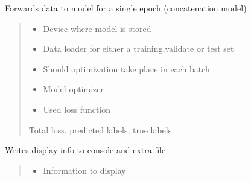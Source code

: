 \documentclass[letterpaper,10pt,english]{sphinxmanual}
\begin{document}
\begin{fulllineitems}
\begin{fulllineitems}
\label{\detokenize{net:net.UVANEMO.__multi_forward}}
\pysigstartsignatures
{}
\pysigstopsignatures
\sphinxAtStartPar
Forwards data to model for a single epoch (concatenation model)
\begin{quote}\begin{description}
\begin{itemize}
\item {} 
\sphinxAtStartPar
{} \textendash{} Device where model is stored

\item {} 
\sphinxAtStartPar
{} \textendash{} Data loader for either a training,validate or test set

\item {} 
\sphinxAtStartPar
{} \textendash{} Should optimization take place in each batch

\item {} 
\sphinxAtStartPar
{} \textendash{} Model optimizer

\item {} 
\sphinxAtStartPar
{} \textendash{} Used loss function

\end{itemize}

\sphinxAtStartPar
Total loss, predicted labels, true labels

\end{description}\end{quote}

\end{fulllineitems}


\begin{fulllineitems}
\label{\detokenize{net:net.UVANEMO.__out}}
\pysigstartsignatures
{}
\pysigstopsignatures
\sphinxAtStartPar
Writes display info to console and extra file
\begin{quote}\begin{description}
\begin{itemize}
\item {} 
\sphinxAtStartPar
{} \textendash{} Information to display


\end{itemize}
\end{description}
\end{quote}
\end{fulllineitems}
\end{fulllineitems}
\end{document}
